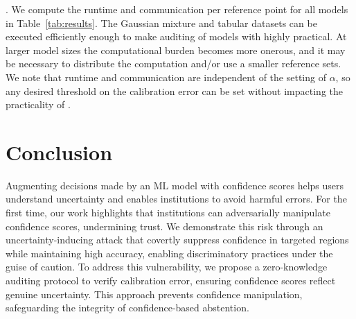 . We compute the runtime and communication per reference point for all models in Table~\ref{tab:results}. The Gaussian mixture and tabular datasets can be executed efficiently enough to make auditing of models with \name highly practical. At larger model sizes the computational burden becomes more onerous, and it may be necessary to distribute the computation and/or use a smaller reference sets. We note that runtime and communication are independent of the setting of $\alpha$, so any desired threshold on the calibration error can be set without impacting the practicality of \name.

\section{Conclusion}



Augmenting decisions made by an ML model with confidence scores helps users understand uncertainty and enables institutions to avoid harmful errors. For the first time, our work highlights that institutions can adversarially manipulate confidence scores, undermining trust. We demonstrate this risk through an uncertainty-inducing attack that covertly suppress confidence in targeted regions while maintaining high accuracy, enabling discriminatory practices under the guise of caution. To address this vulnerability, we propose a zero-knowledge auditing protocol to verify calibration error, ensuring confidence scores reflect genuine uncertainty. This approach prevents confidence manipulation, safeguarding the integrity of confidence-based abstention.

